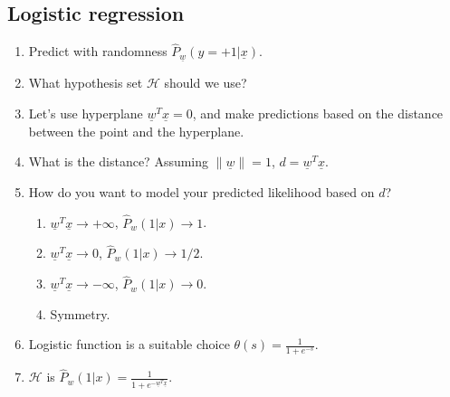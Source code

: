 \subsection{Logistic regression}
\begin{process}
    \begin{enumerate}
        \item Predict with randomness $\hat{P}_{\underline{w}} (y = +1| \underline{x})$.
        \item What hypothesis set $\mathcal{H}$ should we use?
        \item Let's use hyperplane $\underline{w}^T \underline{x} = 0$, and make predictions based on the distance between the point and the hyperplane.
        \item What is the distance? Assuming $\|\underline{w}\| = 1$, $d = \underline{w}^T \underline{x}$.
        \item How do you want to model your predicted likelihood based on $d$?
        \begin{enumerate}
            \item $\underline{w}^T \underline{x} \rightarrow +\infty$, $\hat{P}_w(1|x) \rightarrow 1$.
            \item $\underline{w}^T \underline{x} \rightarrow 0$, $\hat{P}_w(1|x) \rightarrow 1/2$.
            \item $\underline{w}^T \underline{x} \rightarrow -\infty$, $\hat{P}_w(1|x) \rightarrow 0$.
            \item Symmetry.
        \end{enumerate}
        \item Logistic function is a suitable choice $\theta(s) = \frac{1}{1 + e^{-s}}$.
        \item $\mathcal{H}$ is $\hat{P}_w(1|x) = \frac{1}{1 + e^{-\underline{w}^T \underline{x}}}$.
    \end{enumerate}    
\end{process}

